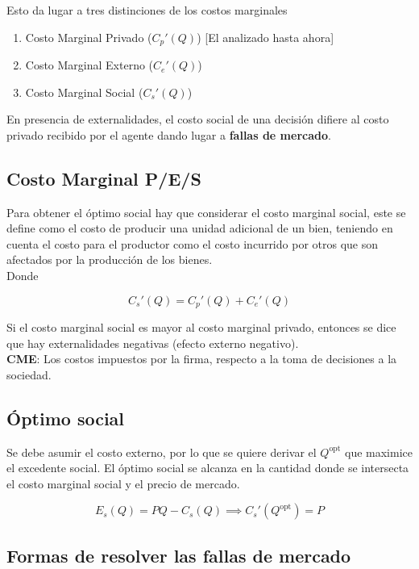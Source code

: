 Esto da lugar a tres distinciones de los costos marginales
\begin{enumerate}[label=\roman*.-]
    \item Costo Marginal Privado ($C_p'(Q)$) [El analizado hasta ahora]
    \item Costo Marginal Externo ($C_e'(Q)$)
    \item Costo Marginal Social ($C_s'(Q)$)
\end{enumerate}

En presencia de externalidades, el costo social de una decisión difiere al costo privado recibido por el agente dando lugar a \textbf{fallas de mercado}.\\

\subsection{Costo Marginal P/E/S}

Para obtener el óptimo social hay que considerar el costo marginal social, este se define como el costo de producir una unidad adicional de un bien, teniendo en cuenta el costo para el productor como el costo incurrido por otros que son afectados por la producción de los bienes.\\

Donde

\[C_s'(Q) = C_p'(Q) + C_e'(Q)\]

Si el costo marginal social es mayor al costo marginal privado, entonces se dice que hay externalidades negativas (efecto externo negativo).\\

\textbf{CME}: Los costos impuestos por la firma, respecto a la toma de decisiones a la sociedad.

\subsection{Óptimo social}

Se debe asumir el costo externo, por lo que se quiere derivar el $Q^{\text{opt}}$ que maximice el excedente social. El óptimo social se alcanza en la cantidad donde se intersecta el costo marginal social y el precio de mercado.

\[E_s(Q) = PQ - C_s(Q) \implies C_s'(Q^{\text{opt}}) = P\]

\subsection{Formas de resolver las fallas de mercado}

